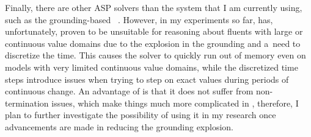 Finally, there are other ASP solvers than the \scasp{} system that I am currently using, such as the grounding-based \clingo{}~\cite{clingo-paper}.
%
However, in my experiments so far, \clingo{} has, unfortunately, proven to be unsuitable for reasoning about fluents with large or continuous value domains due to the explosion in the grounding and a~need to discretize the time.
%
This causes the solver to quickly run out of memory even on models with very limited continuous value domains, while the discretized time steps introduce issues when trying to step on exact values during periods of continuous change.
%
An advantage of \clingo{} is that it does not suffer from non-termination issues, which make things much more complicated in \scasp{}, therefore, I plan to further investigate the possibility of using it in my research once advancements are made in reducing the grounding explosion.



